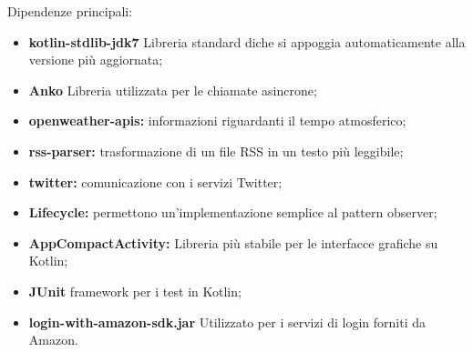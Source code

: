Dipendenze principali:
\begin{itemize}
	\item \textbf {kotlin-stdlib-jdk7} Libreria standard diche si appoggia automaticamente alla versione più aggiornata;
	\item \textbf {Anko} Libreria utilizzata per le chiamate asincrone;
	\item \textbf{openweather-apis:} informazioni riguardanti il tempo atmosferico;
	\item \textbf{rss-parser:} trasformazione di un file RSS in un testo più leggibile;
	\item \textbf{twitter:} comunicazione con i servizi Twitter;
	\item \textbf{Lifecycle:} permettono un'implementazione semplice al pattern observer;
	\item \textbf{AppCompactActivity:} Libreria più stabile per le interfacce grafiche su Kotlin;
	\item \textbf{JUnit} framework per i test in Kotlin;
	\item \textbf{login-with-amazon-sdk.jar} Utilizzato per i servizi di login forniti da Amazon.
\end{itemize}
